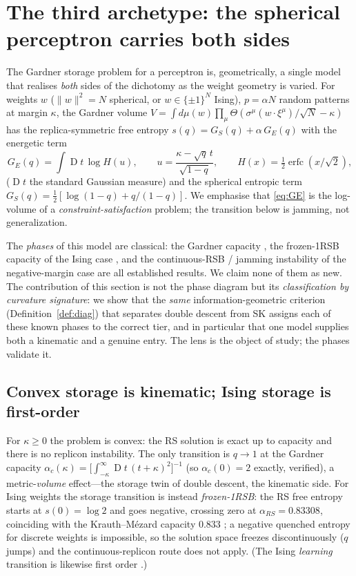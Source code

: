 \documentclass[a4paper,11pt]{article}
\theoremstyle{plain}
\theoremstyle{definition}
\theoremstyle{remark}
\DeclareMathOperator{\Dz}{D}
\begin{document}
\section{The third archetype: the spherical perceptron carries both sides}\label{sec:perceptron}
The Gardner storage problem for a perceptron \cite{gardner1988,gardnerderrida1988} is, geometrically, a
single model that realises \emph{both} sides of the dichotomy as the weight geometry is varied. For weights
$w$ ($\|w\|^2=N$ spherical, or $w\in\{\pm1\}^N$ Ising), $p=\alpha N$ random patterns at margin $\kappa$, the
Gardner volume $V=\int d\mu(w)\prod_\mu\Theta(\sigma^\mu(w\!\cdot\!\xi^\mu)/\sqrt N-\kappa)$ has the
replica-symmetric free entropy $s(q)=G_S(q)+\alpha\,G_E(q)$ with the energetic term
\begin{equation}
G_E(q)=\int \Dz t\,\log H(u),\qquad u=\frac{\kappa-\sqrt q\,t}{\sqrt{1-q}},\qquad
H(x)=\tfrac12\operatorname{erfc}(x/\sqrt2),
\label{eq:GE}
\end{equation}
($\Dz t$ the standard Gaussian measure) and the spherical entropic term
$G_S(q)=\tfrac12[\log(1-q)+q/(1-q)]$. We emphasise that \eqref{eq:GE} is the log-volume of a
\emph{constraint-satisfaction} problem; the transition below is jamming, not generalization.

The \emph{phases} of this model are classical: the Gardner capacity \cite{gardner1988,gardnerderrida1988},
the frozen-1RSB capacity of the Ising case \cite{krauthmezard1989}, and the continuous-RSB / jamming
instability of the negative-margin case are all established results. We claim none of them as new. The
contribution of this section is not the phase diagram but its \emph{classification by curvature signature}:
we show that the \emph{same} information-geometric criterion (Definition~\ref{def:diag}) that separates
double descent from SK assigns each of these known phases to the correct tier, and in particular that one
model supplies both a kinematic and a genuine entry. The lens is the object of study; the phases validate
it.

\subsection{Convex storage is kinematic; Ising storage is first-order}\label{sec:perc-convex}
For $\kappa\ge0$ the problem is convex: the RS solution is exact up to capacity and there is no replicon
instability. The only transition is $q\to1$ at the Gardner capacity
$\alpha_c(\kappa)=\big[\int_{-\kappa}^\infty \Dz t\,(t+\kappa)^2\big]^{-1}$ (so $\alpha_c(0)=2$ exactly,
verified), a metric-\emph{volume} effect---the storage twin of double descent, the kinematic side. For
Ising weights the storage transition is instead \emph{frozen-1RSB}: the RS free entropy starts at
$s(0)=\log2$ and goes negative, crossing zero at $\alpha_{RS}=0.83308$, coinciding with the Krauth--M\'ezard
capacity $0.833$ \cite{krauthmezard1989}; a negative quenched entropy for discrete weights is impossible, so
the solution space freezes discontinuously ($q$ jumps) and the continuous-replicon route does not apply.
(The Ising \emph{learning} transition is likewise first order \cite{gyorgyi1990}.)
\end{document}
